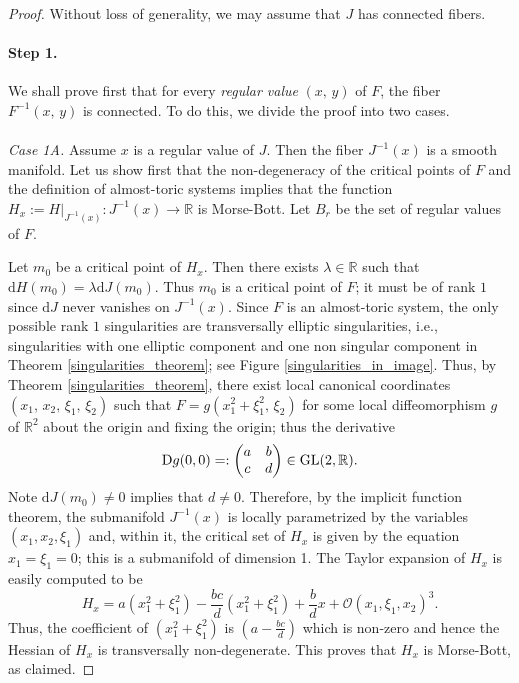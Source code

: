 \documentclass[11pt]{article}
\newcommand{\DD}{\mathrm{d}}
\begin{document}
\begin{proof}
  Without loss of generality, we may assume that $J$ has connected
  fibers.

  \paragraph{Step 1.} We shall prove first that for every
  \textit{regular value} $(x,\,y)$ of $F$, the fiber $F^{-1}(x,\,y)$
  is connected. To do this, we divide the proof into two cases.
\\
\\
  \emph{Case 1A.} Assume $x$ is a regular value of $J$.  Then the
  fiber $J^{-1}(x)$ is a smooth manifold. Let us show first that the
  non-degeneracy of the critical points of $F $ and the definition of
  almost-toric systems implies that the function $H_x:=H|_{J^{-1}(x)}
  \colon J^{-1}(x) \to \mathbb{R} $ is Morse-Bott. Let $B_r$ be the
  set of regular values of $F$.

  Let $m_0$ be a critical point of $H_x$. Then there exists
  $\lambda\in \mathbb{R}$ such that $\DD H(m_0)=\lambda \DD
  J(m_0)$. Thus $m_0$ is a critical point of $F$; it must be of rank
  $1$ since $\DD J$ never vanishes on $J^{-1}(x)$. Since $F$ is an
  almost-toric system, the only possible rank $1$ singularities are
  transversally elliptic singularities, i.e., singularities with 
  one elliptic component and one non singular component in Theorem
  \ref{singularities_theorem}; see Figure
  \ref{singularities_in_image}. Thus, by Theorem
  \ref{singularities_theorem}, there exist local canonical coordinates
  $(x_1,\,x_2,\,\xi_1,\,\xi_2)$ such that $F=g(x_1^2+\xi_1^2,\,\xi_2)$
  for some local diffeomorphism $g$ of $\mathbb{R}^2$ about the origin
  and fixing the origin; thus the derivative
  \[
  {\rm D}g(0,0)=:
  \begin{pmatrix}
    a & b\\c & d
  \end{pmatrix} \in \operatorname{GL}(2, \mathbb{R}).
  \]
  Note $\DD J(m_0)\neq 0$ implies that $d\neq 0$. Therefore, by the
  implicit function theorem, the submanifold $J^{-1}(x)$ is locally
  parametrized by the variables $(x_1,x_2,\xi_1)$ and, within it, the
  critical set of $H_x$ is given by the equation $x_1=\xi_1=0$; this
  is a submanifold of dimension 1. The Taylor expansion of $H_x$ is
  easily computed to be
  \begin{equation}
    H_x = a(x_1^2+\xi_1^2) -\frac{bc}{d}(x_1^2+\xi_1^2) 
    + \frac{b}{d}x + \mathcal{O}(x_1,\xi_1,x_2)^3.
    \label{equ:Hx}  
  \end{equation}
  Thus, the coefficient of $(x_1^2+\xi_1^2)$ is $(a-\frac{bc}{d})$
  which is non-zero and hence the Hessian of $H_x$ is transversally
  non-degenerate. This proves that $H_x$ is Morse-Bott, as claimed.



\end{proof}
\end{document}
